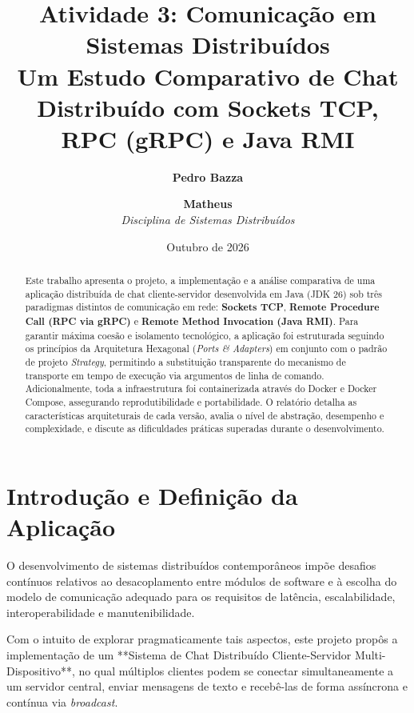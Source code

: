 \documentclass[12pt,a4paper]{article}
\title{
    \textbf{Atividade 3: Comunicação em Sistemas Distribuídos}\\
    \large Um Estudo Comparativo de Chat Distribuído com Sockets TCP, RPC (gRPC) e Java RMI
}
\author{
    \textbf{Pedro Bazza} \and \textbf{Matheus} \\
    \textit{Disciplina de Sistemas Distribuídos}
}
\date{Outubro de 2026}
\begin{document}
\maketitle

\begin{abstract}
Este trabalho apresenta o projeto, a implementação e a análise comparativa de uma aplicação distribuída de chat cliente-servidor desenvolvida em Java (JDK 26) sob três paradigmas distintos de comunicação em rede: \textbf{Sockets TCP}, \textbf{Remote Procedure Call (RPC via gRPC)} e \textbf{Remote Method Invocation (Java RMI)}. Para garantir máxima coesão e isolamento tecnológico, a aplicação foi estruturada seguindo os princípios da Arquitetura Hexagonal (\textit{Ports \& Adapters}) em conjunto com o padrão de projeto \textit{Strategy}, permitindo a substituição transparente do mecanismo de transporte em tempo de execução via argumentos de linha de comando. Adicionalmente, toda a infraestrutura foi containerizada através do Docker e Docker Compose, assegurando reprodutibilidade e portabilidade. O relatório detalha as características arquiteturais de cada versão, avalia o nível de abstração, desempenho e complexidade, e discute as dificuldades práticas superadas durante o desenvolvimento.
\end{abstract}

\newpage
\tableofcontents
\newpage

\section{Introdução e Definição da Aplicação}

O desenvolvimento de sistemas distribuídos contemporâneos impõe desafios contínuos relativos ao desacoplamento entre módulos de software e à escolha do modelo de comunicação adequado para os requisitos de latência, escalabilidade, interoperabilidade e manutenibilidade. 

Com o intuito de explorar pragmaticamente tais aspectos, este projeto propôs a implementação de um **Sistema de Chat Distribuído Cliente-Servidor Multi-Dispositivo**, no qual múltiplos clientes podem se conectar simultaneamente a um servidor central, enviar mensagens de texto e recebê-las de forma assíncrona e contínua via \textit{broadcast}.
\end{document}
